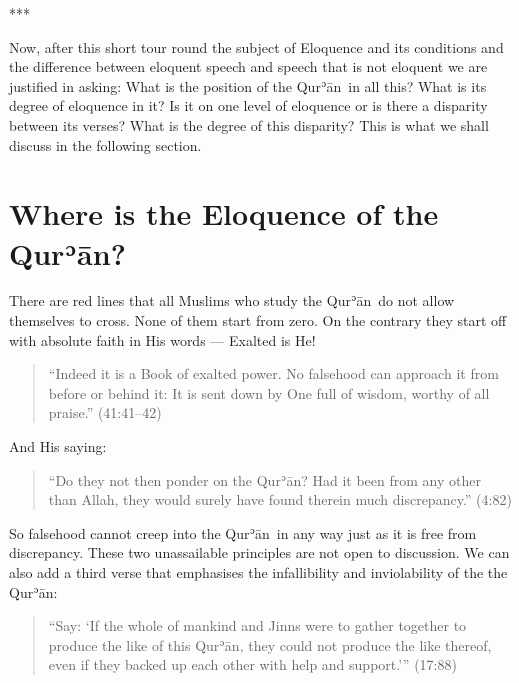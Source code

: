 \documentclass[12pt]{memoir}
\def\´{ʾ} %
\newcommand{\ar}[1]{\RL{\arabicfont#1}}
\def \Quran{Qur\-\´ān} %
\def\pardivider{\centerline{***}} %
\newcommand{\QRef}[1]{{\color{darkblue}#1}}
\begin{document}
\pardivider

Now, after this short tour round the subject of Eloquence and its conditions
and the difference between eloquent speech and speech
that is not eloquent we are justified in asking:
What is the position of the \Quran\ in all this?
What is its degree of eloquence in it?
Is it on one level of eloquence or is there a disparity between its verses?
What is the degree of this disparity?
This is what we shall discuss in the following section.

\section{Where is the Eloquence of the \Quran?}

There are red lines that all Muslims who study the \Quran\
do not allow themselves to cross.
None of them start from zero.
On the contrary they start off with absolute faith in His words —
Exalted is He!

\begin{quote}
“Indeed it is a Book of exalted power.
No falsehood can approach it from before or behind it:
It is sent down by One full of wisdom, worthy of all praise.”
(\QRef{41:41–42})
\end{quote}

And His saying:

\begin{quote}
“Do they not then ponder on the \Quran?
Had it been from any other than Allah,
they would surely have found therein much discrepancy.” (\QRef{4:82})
\end{quote}

So falsehood cannot creep into the \Quran\ in any way
just as it is free from discrepancy.
These two unassailable principles are not open to discussion.
We can also add a third verse that emphasises the infallibility
and inviolability of the the \Quran:

\begin{quote}
“Say: ‘If the whole of mankind and Jinns were to gather together
to produce the like of this \Quran, they could not produce the like thereof,
even if they backed up each other with help and support.’” (\QRef{17:88})
\end{quote}
\end{document}
